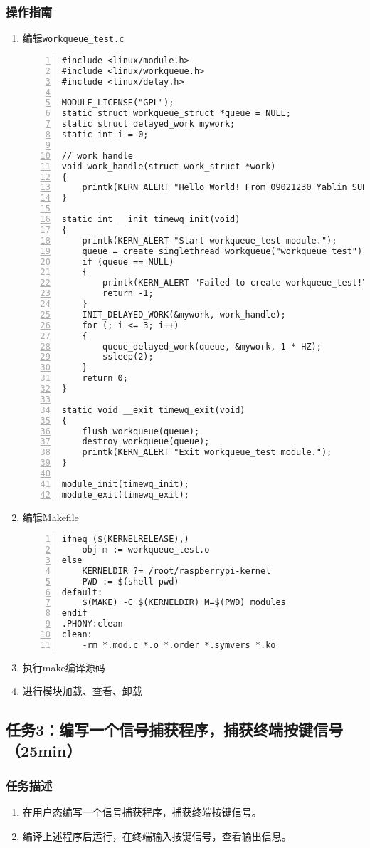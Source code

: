 \documentclass{article}
\begin{document}
\subsubsection{操作指南}
\begin{enumerate}

	\item 编辑\verb|workqueue_test.c|
\begin{lstlisting}[numbers=left]
#include <linux/module.h>
#include <linux/workqueue.h>
#include <linux/delay.h>

MODULE_LICENSE("GPL");
static struct workqueue_struct *queue = NULL;
static struct delayed_work mywork;
static int i = 0;

// work handle
void work_handle(struct work_struct *work)
{
	printk(KERN_ALERT "Hello World! From 09021230 Yablin SUN\n");
}

static int __init timewq_init(void)
{
	printk(KERN_ALERT "Start workqueue_test module.");
	queue = create_singlethread_workqueue("workqueue_test");
	if (queue == NULL)
	{
		printk(KERN_ALERT "Failed to create workqueue_test!\n");
		return -1;
	}
	INIT_DELAYED_WORK(&mywork, work_handle);
	for (; i <= 3; i++)
	{
		queue_delayed_work(queue, &mywork, 1 * HZ);
		ssleep(2);
	}
	return 0;
}

static void __exit timewq_exit(void)
{
	flush_workqueue(queue);
	destroy_workqueue(queue);
	printk(KERN_ALERT "Exit workqueue_test module.");
}

module_init(timewq_init);
module_exit(timewq_exit);

\end{lstlisting}
    \item 编辑Makefile
\begin{lstlisting}[numbers=left]
ifneq ($(KERNELRELEASE),)
	obj-m := workqueue_test.o
else
	KERNELDIR ?= /root/raspberrypi-kernel
	PWD := $(shell pwd)
default:
	$(MAKE) -C $(KERNELDIR) M=$(PWD) modules
endif
.PHONY:clean
clean:
	-rm *.mod.c *.o *.order *.symvers *.ko
\end{lstlisting}
    \item 执行make编译源码
    \item 进行模块加载、查看、卸载
\end{enumerate}

\newpage
\subsection{任务3：编写一个信号捕获程序，捕获终端按键信号（25min）}

\subsubsection{任务描述}
\begin{enumerate}
    \item 在用户态编写一个信号捕获程序，捕获终端按键信号。
    \item 编译上述程序后运行，在终端输入按键信号，查看输出信息。
\end{enumerate}
\end{document}
